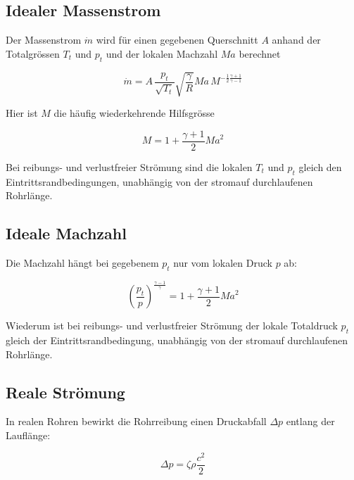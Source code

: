 \documentclass[a4paper,10pt,twocolumn]{article}
\begin{document}
\subsection{Idealer Massenstrom}

Der Massenstrom $\dot m$ wird für einen gegebenen Querschnitt $A$ anhand der Totalgrössen $T_t$ und $p_t$ und der lokalen Machzahl $\mathit{Ma}$ berechnet

\begin{equation}
\dot m = A \, \frac{p_t}{\sqrt{T_t}} \sqrt{\frac{\gamma}{R}} \mathit{Ma} \, M^{- \frac{1}{2}\frac{\gamma + 1}{\gamma - 1}}
\end{equation}

Hier ist $M$ die häufig wiederkehrende Hilfsgrösse

\begin{equation}
M = 1 + \frac{\gamma + 1}{2} \mathit{Ma} ^2
\end{equation}

Bei reibungs- und verlustfreier Strömung sind die lokalen 
$T_t$ und $p_t$ gleich den Eintrittsrandbedingungen, unabhängig von der stromauf durchlaufenen Rohrlänge.



\subsection{Ideale Machzahl}

Die Machzahl hängt bei gegebenem $p_t$ nur vom lokalen Druck $p$ ab:

\begin{equation}
\left(\frac{p_t}{p}\right)^\frac{\gamma-1}{\gamma} = 1 + \frac{\gamma + 1}{2} \mathit{Ma} ^2 \label{eq:totaldruckverhaeltnis}
\end{equation}

Wiederum ist bei reibungs- und verlustfreier Strömung der lokale Totaldruck $p_t$ gleich der Eintrittsrandbedingung, unabhängig von der stromauf durchlaufenen Rohrlänge.


\subsection{Reale Strömung}

In realen Rohren bewirkt die Rohrreibung einen Druckabfall $\Delta p$ entlang der Lauflänge:

\begin{equation}
\Delta p = \zeta \rho \frac{c^2}{2}
\end{equation}
\end{document}

